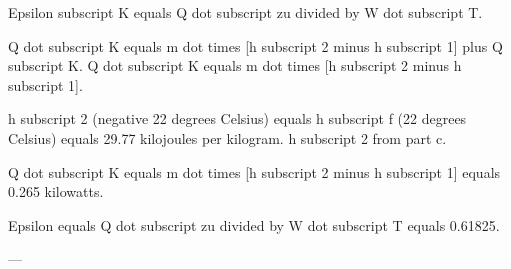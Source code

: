Epsilon subscript K equals Q dot subscript zu divided by W dot subscript T.  

Q dot subscript K equals m dot times [h subscript 2 minus h subscript 1] plus Q subscript K.  
Q dot subscript K equals m dot times [h subscript 2 minus h subscript 1].  

h subscript 2 (negative 22 degrees Celsius) equals h subscript f (22 degrees Celsius) equals 29.77 kilojoules per kilogram.  
h subscript 2 from part c.  

Q dot subscript K equals m dot times [h subscript 2 minus h subscript 1] equals 0.265 kilowatts.  

Epsilon equals Q dot subscript zu divided by W dot subscript T equals 0.61825.  

---